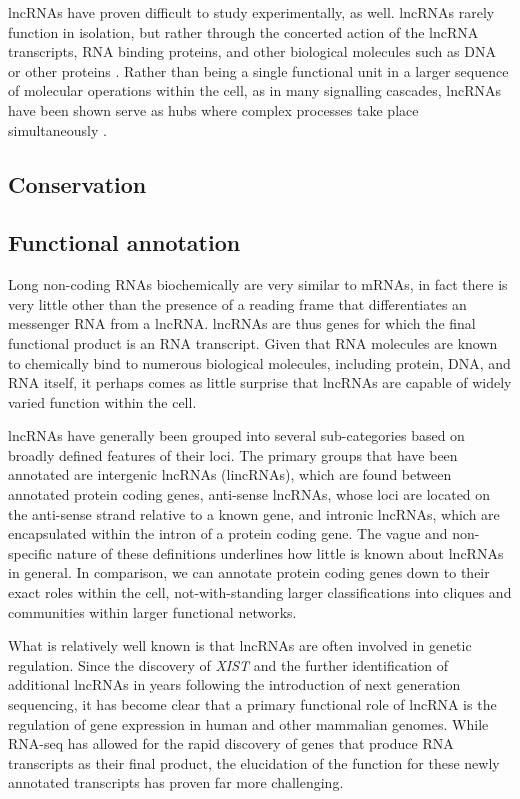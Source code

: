 lncRNAs have proven difficult to study experimentally, as well. lncRNAs rarely function in isolation, but rather through the concerted action of the lncRNA transcripts, RNA binding proteins, and other biological molecules such as DNA or other proteins \cite{Chu2015SystematicProteins,Schertzer2019LncRNA-InducedDNA,Hacisuleyman2016FunctionLocus,Wang2011AExpression,Yang2013MALAT-1Regulation}. Rather than being a single functional unit in a larger sequence of molecular operations within the cell, as in many signalling cascades, lncRNAs have been shown serve as hubs where complex processes take place simultaneously \cite{Schertzer2019LncRNA-InducedDNA, Chu2015SystematicProteins, Moindrot2015ASilencing,Brockdorff2018LocalNcRNA}. 

\subsection{Conservation}

\subsection{Functional annotation}
Long non-coding RNAs biochemically are very similar to mRNAs, in fact there is very little other than the presence of a reading frame that differentiates an messenger RNA from a lncRNA. lncRNAs are thus genes for which the final functional product is an RNA transcript. Given that RNA molecules are known to chemically bind to numerous biological molecules, including protein, DNA, and RNA itself, it perhaps comes as little surprise that lncRNAs are capable of widely varied function within the cell. 

lncRNAs have generally been grouped into several sub-categories based on broadly defined features of their loci. The primary groups that have been annotated are intergenic lncRNAs (lincRNAs), which are found between annotated protein coding genes, anti-sense lncRNAs, whose loci are located on the anti-sense strand relative to a known gene, and intronic lncRNAs, which are encapsulated within the intron of a protein coding gene. The vague and non-specific nature of these definitions underlines how little is known about lncRNAs in general. In comparison, we can annotate protein coding genes down to their exact roles within the cell, not-with-standing larger classifications into cliques and communities within larger functional networks. 

What is relatively well known is that lncRNAs are often involved in genetic regulation. Since the discovery of \emph{XIST} and the further identification of additional lncRNAs in years following the introduction of next generation sequencing, it has become clear that a primary functional role of lncRNA is the regulation of gene expression in human and other mammalian genomes. While RNA-seq has allowed for the rapid discovery of genes that produce RNA transcripts as their final product, the elucidation of the function for these newly annotated transcripts has proven far more challenging. 

